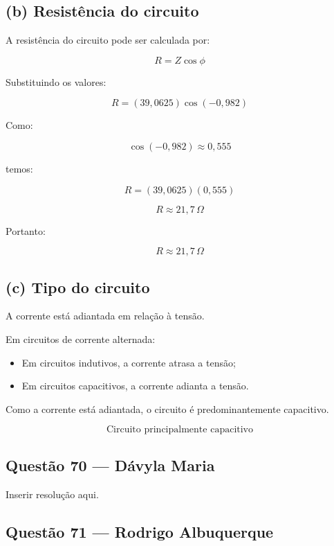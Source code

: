 \documentclass[12pt,a4paper]{article}
\begin{document}

\subsection*{(b) Resistência do circuito}

A resistência do circuito pode ser calculada por:

\[
R=Z\cos\phi
\]

Substituindo os valores:

\[
R=(39,0625)\cos(-0,982)
\]

Como:

\[
\cos(-0,982)\approx 0,555
\]

temos:

\[
R=(39,0625)(0,555)
\]

\[
R\approx 21,7\,\Omega
\]

Portanto:

\[
\boxed{R\approx 21,7\,\Omega}
\]


\subsection*{(c) Tipo do circuito}

A corrente está adiantada em relação à tensão.

Em circuitos de corrente alternada:

\begin{itemize}
    \item Em circuitos indutivos, a corrente atrasa a tensão;
    \item Em circuitos capacitivos, a corrente adianta a tensão.
\end{itemize}

Como a corrente está adiantada, o circuito é predominantemente
capacitivo.

\[
\boxed{\text{Circuito principalmente capacitivo}}
\]

\subsection{Questão 70 — Dávyla Maria}
Inserir resolução aqui.

\subsection{Questão 71 — Rodrigo Albuquerque}
\end{document}
